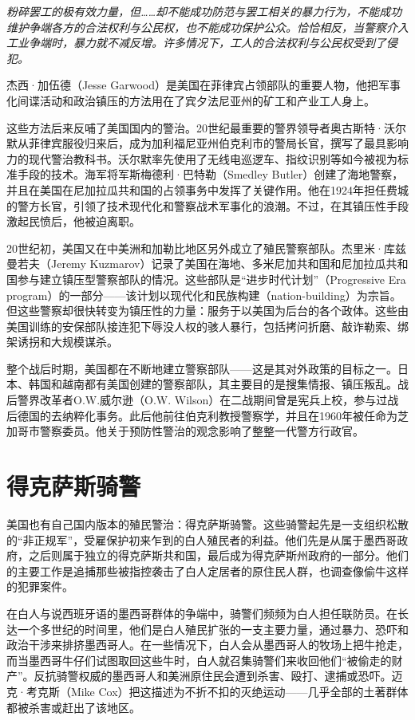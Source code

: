 \documentclass[fontset=fandol, a4paper, 12pt, openright]{ctexbook}
\renewenvironment{quote}
  {\list{}{\rightmargin\leftmargin}%
   \item\relax\small\itshape\color{black}}
  {\endlist}
\begin{document}
\begin{quote}
粉碎罢工的极有效力量，但……却不能成功防范与罢工相关的暴力行为，不能成功维护争端各方的合法权利与公民权，也不能成功保护公众。恰恰相反，当警察介入工业争端时，暴力就不减反增。许多情况下，工人的合法权利与公民权受到了侵犯。
\end{quote}

杰西·加伍德（Jesse Garwood）是美国在菲律宾占领部队的重要人物，他把军事化间谍活动和政治镇压的方法用在了宾夕法尼亚州的矿工和产业工人身上。

这些方法后来反哺了美国国内的警治。20世纪最重要的警界领导者奥古斯特·沃尔默从菲律宾服役归来后，成为加利福尼亚州伯克利市的警局长官，撰写了最具影响力的现代警治教科书。沃尔默率先使用了无线电巡逻车、指纹识别等如今被视为标准手段的技术。海军将军斯梅德利·巴特勒（Smedley Butler）创建了海地警察，并且在美国在尼加拉瓜共和国的占领事务中发挥了关键作用。他在1924年担任费城的警方长官，引领了技术现代化和警察战术军事化的浪潮。不过，在其镇压性手段激起民愤后，他被迫离职。

20世纪初，美国又在中美洲和加勒比地区另外成立了殖民警察部队。杰里米·库兹曼若夫（Jeremy Kuzmarov）记录了美国在海地、多米尼加共和国和尼加拉瓜共和国参与建立镇压型警察部队的情况。这些部队是“进步时代计划”（Progressive Era program）的一部分——该计划以现代化和民族构建（nation-building）为宗旨。但这些警察却很快转变为镇压性的力量：服务于以美国为后台的各个政体。这些由美国训练的安保部队接连犯下辱没人权的骇人暴行，包括拷问折磨、敲诈勒索、绑架诱拐和大规模谋杀。

整个战后时期，美国都在不断地建立警察部队——这是其对外政策的目标之一。日本、韩国和越南都有美国创建的警察部队，其主要目的是搜集情报、镇压叛乱。战后警界改革者O.W.威尔逊（O.W. Wilson）在二战期间曾是宪兵上校，参与过战后德国的去纳粹化事务。此后他前往伯克利教授警察学，并且在1960年被任命为芝加哥市警察委员。他关于预防性警治的观念影响了整整一代警方行政官。

\section{得克萨斯骑警}

美国也有自己国内版本的殖民警治：得克萨斯骑警。这些骑警起先是一支组织松散的“非正规军”，受雇保护初来乍到的白人殖民者的利益。他们先是从属于墨西哥政府，之后则属于独立的得克萨斯共和国，最后成为得克萨斯州政府的一部分。他们的主要工作是追捕那些被指控袭击了白人定居者的原住民人群，也调查像偷牛这样的犯罪案件。

在白人与说西班牙语的墨西哥群体的争端中，骑警们频频为白人担任联防员。在长达一个多世纪的时间里，他们是白人殖民扩张的一支主要力量，通过暴力、恐吓和政治干涉来排挤墨西哥人。在一些情况下，白人会从墨西哥人的牧场上把牛抢走，而当墨西哥牛仔们试图取回这些牛时，白人就召集骑警们来收回他们“被偷走的财产”。反抗骑警权威的墨西哥人和美洲原住民会遭到杀害、殴打、逮捕或恐吓。迈克·考克斯（Mike Cox）把这描述为不折不扣的灭绝运动——几乎全部的土著群体都被杀害或赶出了该地区。
\end{document}
